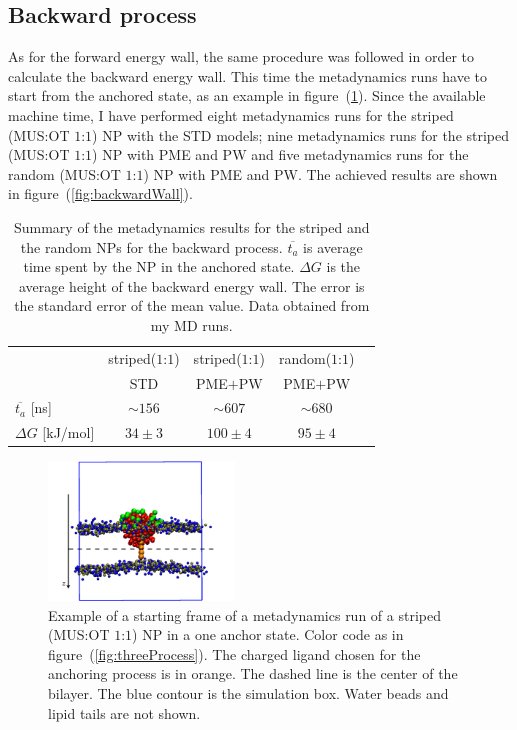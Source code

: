 \subsection{Backward process}
As for the forward energy wall, the same procedure was followed in order to calculate the backward energy wall. 
This time the metadynamics runs have to start from the anchored state, as an example in 
figure~(\ref{fig:startFrameAnchored}). Since the available machine time, I have performed eight metadynamics runs 
for the striped (\ac{MUS}:\ac{OT} $1$:$1$) \ac{NP} with the \ac{STD} \martini{} models; nine metadynamics runs for 
the striped (\ac{MUS}:\ac{OT} $1$:$1$) \ac{NP} with \ac{PME} and \ac{PW} and five metadynamics runs for the random 
(\ac{MUS}:\ac{OT} $1$:$1$) \ac{NP} with \ac{PME} and \ac{PW}. The achieved results are shown in 
figure~(\ref{fig:backwardWall}).
\begin{table}[h!t]
	\centering
	\begin{tabular}{lcccc}
		\toprule
		\,					& striped($1$:$1$)	& striped($1$:$1$)	& random($1$:$1$)	\\
		\,					& STD & \acs{PME}$+$\acs{PW} & \acs{PME}$+$\acs{PW} \\ \toprule
	$\overline{t_{a}}$ [ns]	& $\sim 156$	& $\sim 607$	& $\sim 680$	\\ \midrule
	$\Delta G$ [kJ/mol] 	& $34 \pm 3$ 	& $100 \pm 4$ 	& $95 \pm 4$	\\ \bottomrule
	\end{tabular}
	\caption{Summary of the metadynamics results for the striped and the random \acp{NP} for the backward process. $\overline{t_a}$ is average time spent by the \acs{NP} in the anchored state. $\Delta G$ is the average height of the backward energy wall. The error is the standard error of the mean value. Data obtained from my \acs{MD} runs.}%
	\label{tab:anchorTime}
\end{table}

\begin{figure}
	\centering
	\includegraphics[width=0.44\textwidth]{./img/patchedAnchored.pdf}
	\caption{Example of a starting frame of a metadynamics run of a striped (\ac{MUS}:\ac{OT} $1$:$1$) \ac{NP} in a one anchor state. Color code as in figure~(\ref{fig:threeProcess}). The charged ligand chosen for the anchoring process is in orange. The dashed line is the center of the bilayer. The blue contour is the simulation box. Water beads and lipid tails are not shown.}%
	\label{fig:startFrameAnchored}
\end{figure}

